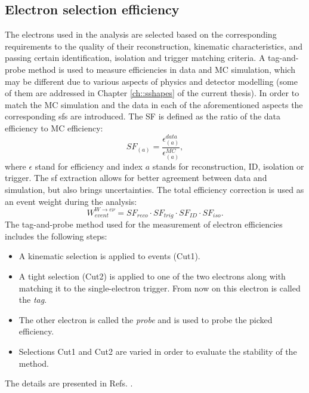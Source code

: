     \subsection{Electron selection efficiency}
    The electrons used in the analysis are selected based on the corresponding requirements to the quality of their reconstruction, kinematic characteristics, and passing certain identification, isolation and trigger matching criteria. A tag-and-probe method is used to measure efficiencies in data and MC simulation, which may be different due to various aspects of physics and detector modelling (some of them are addressed in Chapter \ref{ch::sshapes} of the current thesis). In order to match the MC simulation and the data in each of the aforementioned aspects the corresponding \gls{sf}s are introduced. The SF is defined as the ratio of the data efficiency to MC efficiency:
     \begin{equation*}
     SF_{(a)}=\frac{\epsilon^{data}_{(a)}}{\epsilon^{MC}_{(a)}},
     \end{equation*}
     where $\epsilon$ stand for efficiency and index $a$ stands for reconstruction, ID, isolation or trigger. The \gls{sf} extraction allows for better agreement between data and simulation, but also brings uncertainties. The total efficiency correction is used as an event weight during the analysis:
     \begin{equation*}
     W_{event}^{W\rightarrow e\nu}=SF_{reco} \cdot SF_{trig} \cdot SF_{ID} \cdot SF_{iso}.
     \end{equation*}
     The tag-and-probe method used for the measurement of electron efficiencies includes the following steps:
     \begin{itemize}
     	\item A kinematic selection is applied to \Zee events (Cut1).
     	\item A tight selection (Cut2) is applied to one of the two electrons along with matching it to the single-electron trigger. From now on this electron is called the \textit{tag}.
     	\item The other electron is called the \textit{probe} and is used to probe the picked efficiency.
     	\item Selections Cut1 and Cut2 are varied in order to evaluate the stability of the method. 
     \end{itemize}
 	The details are presented in Refs. \cite{Aaboud:2018ugz, electrons_reco1, topoclust_2019}.
